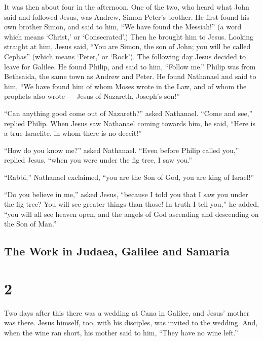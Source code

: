 It was then about four in the afternoon.  One of the two,
who heard what John said and followed Jesus, was Andrew, Simon Peter's
brother.  He first found his own brother Simon, and said to
him, ``We have found the Messiah!'' (a word which means `Christ,' or
`Consecrated'.)  Then he brought him to Jesus. Looking
straight at him, Jesus said, ``You are Simon, the son of John; you will
be called Cephas'' (which means `Peter,' or `Rock').  The
following day Jesus decided to leave for Galilee. He found Philip, and
said to him, ``Follow me.''  Philip was from Bethsaida, the
same town as Andrew and Peter.  He found Nathanael and said
to him, ``We have found him of whom Moses wrote in the Law, and of whom
the prophets also wrote --- Jesus of Nazareth, Joseph's son!''

 ``Can anything good come out of Nazareth?'' asked
Nathanael. ``Come and see,'' replied Philip.  When Jesus
saw Nathanael coming towards him, he said, ``Here is a true Israelite,
in whom there is no deceit!''

 ``How do you know me?'' asked Nathanael. ``Even before
Philip called you,'' replied Jesus, ``when you were under the fig tree,
I saw you.''

 ``Rabbi,'' Nathanael exclaimed, ``you are the Son of God,
you are king of Israel!''

 ``Do you believe in me,'' asked Jesus, ``because I told
you that I saw you under the fig tree? You will see greater things than
those!  In truth I tell you,'' he added, ``you will all see
heaven open, and the angels of God ascending and descending on the Son
of Man.''

\hypertarget{the-work-in-judaea-galilee-and-samaria}{%
\subsection{The Work in Judaea, Galilee and
Samaria}\label{the-work-in-judaea-galilee-and-samaria}}

\hypertarget{section-1}{%
\section{2}\label{section-1}}

 Two days after this there was a wedding at Cana in Galilee,
and Jesus' mother was there.  Jesus himself, too, with his
disciples, was invited to the wedding.  And, when the wine
ran short, his mother said to him, ``They have no wine left.''

